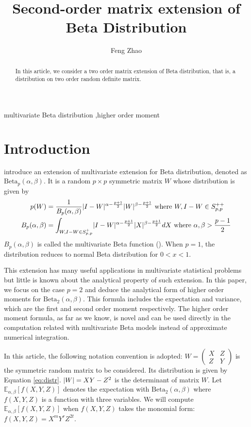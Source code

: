 \documentclass{elsarticle}
\title{Second-order matrix extension of Beta Distribution}
\author{Feng Zhao}
\DeclarePairedDelimiter\abs{\lvert}{\rvert}
\def\E{\mathbb{E}}
\def\Beta{\textrm{Beta}}
\begin{document}
 \begin{abstract}
In this article, we consider a two order matrix extension of Beta distribution,
that is, a distribution on two order random definite matrix.
 \end{abstract}
\begin{keyword}
 multivariate Beta distribution \sep higher order moment
\end{keyword}
\maketitle
\section{Introduction}
\citet{olkin1964} introduce an extension of
multivariate extension for Beta distribution,
denoted as $\Beta_p(\alpha, \beta)$.
It is a random $p\times p$  symmetric matrix $W$ whose distribution
is given by
\begin{align}
p(W) &= \frac{1}{B_p(\alpha, \beta)}\abs{I-W}^{\alpha-\frac{p+1}{2}}
\abs{W}^{\beta-\frac{p+1}{2}} \textrm{ where } W, I-W \in S_{p,p}^{++}
\label{eq:distr}\\
B_p(\alpha, \beta) &= \int_{W,I-W \in S_{p,p}^{+} }\abs{I-W}^{\alpha-\frac{p+1}{2}}
\abs{X}^{\beta-\frac{p+1}{2}}dX \textrm{ where } \alpha, \beta > \frac{p-1}{2}
\end{align}
$B_p(\alpha, \beta)$ is called the multivariate Beta function (\citet{david1981}).
When $p=1$, the distribution reduces to normal Beta distribution for
$0<x<1$.

This extension has many useful applications in multivariate statistical
problems but little is known about the analytical property of such extension.
In this paper, we focus on the case $p=2$ and deduce the analytical form of 
higher order moments for $\Beta_2(\alpha, \beta)$. This formula
includes the expectation and variance, which are the first and second
order moment respectively. The higher order moment formula, as
far as we know, is novel and can be used directly in the computation
related with multivariate Beta models instead of approximate
numerical integration.

In this article, the following notation convention is adopted:
$W=\begin{pmatrix} X & Z \\ Z & Y \end{pmatrix}$ is the symmetric random
matrix to be considered. Its distribution is given by Equation \eqref{eq:distr}.
$\abs{W}=XY-Z^2$ is the determinant of matrix $W$.
Let $\E_{\alpha,\beta}[f(X,Y, Z)]$ denotes the expectation
with $\Beta_2(\alpha, \beta)$ where $f(X, Y, Z)$ is a function with three
variables. We will compute $\E_{\alpha,\beta}[f(X,Y, Z)]$
when $f(X,Y,Z)$ takes the monomial form: $f(X,Y,Z)=X^m Y^r Z^{2t}$.
\end{document}

